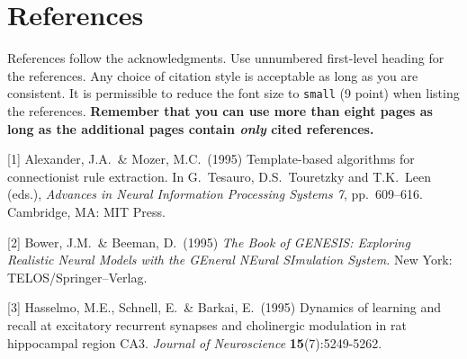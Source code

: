 \documentclass{article}
\begin{document}
\section*{References}

References follow the acknowledgments. Use unnumbered first-level heading for
the references. Any choice of citation style is acceptable as long as you are
consistent. It is permissible to reduce the font size to \verb+small+ (9 point)
when listing the references. {\bf Remember that you can use more than eight
  pages as long as the additional pages contain \emph{only} cited references.}
\medskip

\small

[1] Alexander, J.A.\ \& Mozer, M.C.\ (1995) Template-based algorithms for
connectionist rule extraction. In G.\ Tesauro, D.S.\ Touretzky and T.K.\ Leen
(eds.), {\it Advances in Neural Information Processing Systems 7},
pp.\ 609--616. Cambridge, MA: MIT Press.

[2] Bower, J.M.\ \& Beeman, D.\ (1995) {\it The Book of GENESIS: Exploring
  Realistic Neural Models with the GEneral NEural SImulation System.}  New York:
TELOS/Springer--Verlag.

[3] Hasselmo, M.E., Schnell, E.\ \& Barkai, E.\ (1995) Dynamics of learning and
recall at excitatory recurrent synapses and cholinergic modulation in rat
hippocampal region CA3. {\it Journal of Neuroscience} {\bf 15}(7):5249-5262.
\end{document}
